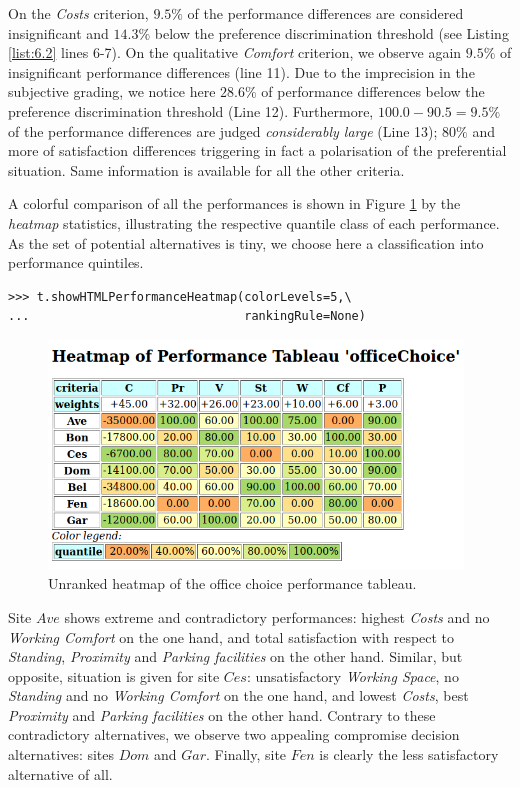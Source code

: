 On the \emph{Costs} criterion, $9.5\%$ of the performance differences are considered insignificant and $14.3\%$ below the preference discrimination threshold (see Listing \ref{list:6.2} lines 6-7). On the qualitative \emph{Comfort} criterion, we observe again $9.5\%$ of insignificant performance differences (line 11). Due to the imprecision in the subjective grading, we notice here $28.6\%$ of performance differences below the preference discrimination threshold (Line 12). Furthermore, $100.0 - 90.5 = 9.5\%$ of the performance differences are judged \emph{considerably large} (Line 13); $80\%$ and more of satisfaction differences triggering in fact a polarisation of the preferential situation. Same information is available for all the other criteria. 
 
A colorful comparison of all the performances is shown in Figure \ref{fig:6.1} by the \emph{heatmap} statistics, illustrating the respective quantile class of each performance. As the set of potential alternatives is tiny, we choose here a classification into performance quintiles.

\begin{lstlisting}
>>> t.showHTMLPerformanceHeatmap(colorLevels=5,\
...                              rankingRule=None)
\end{lstlisting}
    
\begin{figure}[h]
\includegraphics[width=11cm]{Figures/officeChoiceHeatmap.png}
\caption{Unranked heatmap of the office choice performance tableau.}
\label{fig:6.1}       %
\end{figure}

Site $Ave$ shows extreme and contradictory performances: highest \emph{Costs} and no \emph{Working Comfort} on the one hand, and total satisfaction with respect to \emph{Standing}, \emph{Proximity} and \emph{Parking facilities} on the other hand. Similar, but opposite, situation is given for site $Ces$: unsatisfactory \emph{Working Space}, no \emph{Standing} and no \emph{Working Comfort} on the one hand, and lowest \emph{Costs}, best \emph{Proximity} and \emph{Parking facilities} on the other hand. Contrary to these contradictory alternatives, we observe two appealing compromise decision alternatives: sites $Dom$ and $Gar$. Finally, site $Fen$ is clearly the less satisfactory alternative of all.


